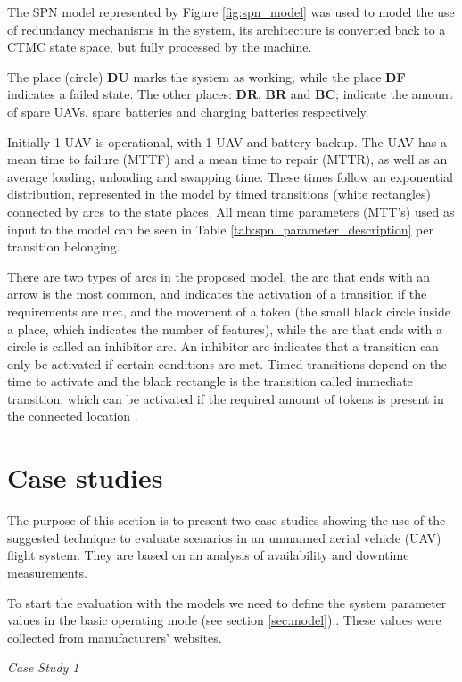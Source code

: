 \documentclass[conference]{IEEEtran}
\begin{document}
The SPN model represented by Figure \ref{fig:spn_model} was used to model the use of redundancy mechanisms in the system, its architecture is converted back to a CTMC state space, but fully processed by the machine.

The place (circle) \textbf{DU} marks the system as working, while the place \textbf{DF} indicates a failed state. The other places: \textbf{DR}, \textbf{BR} and \textbf{BC}; indicate the amount of spare UAVs, spare batteries and charging batteries respectively.

Initially 1 UAV is operational, with 1 UAV and battery backup. The UAV has a mean time to failure (MTTF) and a mean time to repair (MTTR), as well as an average loading, unloading and swapping time. These times follow an exponential distribution, represented in the model by timed transitions (white rectangles) connected by arcs to the state places. All mean time parameters (MTT's) used as input to the model can be seen in Table \ref{tab:spn_parameter_description} per transition belonging.

There are two types of arcs in the proposed model, the arc that ends with an arrow is the most common, and indicates the activation of a transition if the requirements are met, and the movement of a token (the small black circle inside a place, which indicates the number of features), while the arc that ends with a circle is called an inhibitor arc. An inhibitor arc indicates that a transition can only be activated if certain conditions are met. Timed transitions depend on the time to activate and the black rectangle is the transition called immediate transition, which can be activated if the required amount of tokens is present in the connected location \citep{melo2021distributed}.

\section{Case studies}\label{sec:case_studies}
The purpose of this section is to present two case studies showing the use of the suggested technique to evaluate scenarios in an unmanned aerial vehicle (UAV) flight system. They are based on an analysis of availability and downtime measurements.

To start the evaluation with the models we need to define the system parameter values in the basic operating mode (see section \ref{sec:model}).. These values were collected from manufacturers' websites.

\textit{Case Study 1} 
\end{document}
